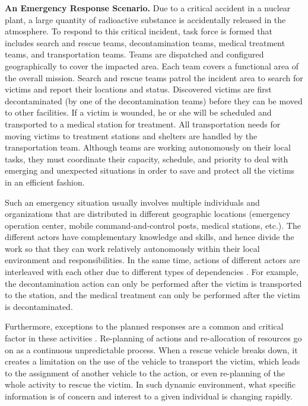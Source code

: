\begin{scenario}
\textbf{An Emergency Response Scenario.} 
Due to a critical accident in a nuclear plant, a large quantity of radioactive substance is accidentally released in the atmosphere. To respond to this critical incident, task force is formed that includes search and rescue teams, decontamination teams, medical treatment teams, and transportation teams. Teams are dispatched and configured geographically to cover the impacted area. Each team covers a functional area of the overall mission.  Search and rescue teams patrol the incident area to search for victims and report their locations and status. Discovered victims are first decontaminated (by one of the decontamination teams) before they can be moved to other facilities.  If a victim is wounded, he or she will be scheduled and transported to a medical station for treatment. All transportation needs for moving victims to treatment stations and shelters are handled by the transportation team. Although teams are working autonomously on their local tasks, they must coordinate their capacity, schedule, and priority to deal with emerging and unexpected situations in order to save and protect all the victims in an efficient fashion.
\end{scenario}

Such an emergency situation usually involves multiple individuals and organizations that are distributed in different geographic locations (emergency operation center, mobile command-and-control posts, medical stations, etc.). The different actors have complementary knowledge and skills, and hence divide the work so that they can work relatively autonomously within their local environment and responsibilities. In the same time, actions of different actors are interleaved with each other due to different types of dependencies \cite{shen2004managing}. For example, the decontamination action can only be performed after the victim is transported to the station, and the medical treatment can only be performed after the victim is decontaminated.

Furthermore, exceptions to the planned responses are a common and critical factor in these activities \cite{Turoff2004}. Re-planning of actions and re-allocation of resources go on as a continuous unpredictable process. When a rescue vehicle breaks down, it creates a limitation on the use of the vehicle to transport the victim, which leads to the assignment of another vehicle to the action, or even re-planning of the whole activity to rescue the victim. In such dynamic environment, what specific information is of concern and interest to a given individual is changing rapidly.

